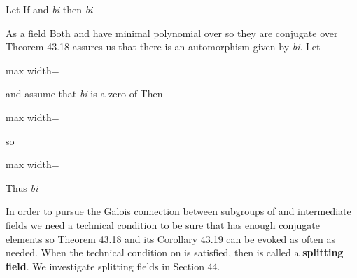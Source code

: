 \documentclass[11pt,oneside]{article}
\begin{document}
\BookNarrativetrue

\begin{BookBody}

 Let  If  and  \textit{bi} then  \textit{bi}

 As a field  Both  and  have minimal polynomial  over  so they are conjugate over  Theorem 43.18 assures us that there is an automorphism   given by  \textit{bi}. Let

\begin{center}\begin{adjustbox}{max width=\linewidth}\end{adjustbox}\end{center}

\noindent and assume that  \textit{bi} is a zero of  Then

\begin{center}\begin{adjustbox}{max width=\linewidth}\end{adjustbox}\end{center}

\noindent so

\begin{center}\begin{adjustbox}{max width=\linewidth}\end{adjustbox}\end{center}

\noindent Thus  \textit{bi} \BookEnd{\blacklozenge}

In order to pursue the Galois connection between subgroups of  and intermediate fields  we need a technical condition to be sure that  has enough conjugate elements so Theorem 43.18 and its Corollary 43.19 can be evoked as often as needed. When the technical condition on  is satisfied, then  is called a\textbf{ splitting field}. We investigate splitting fields in Section 44.


\end{BookBody}
\end{document}
